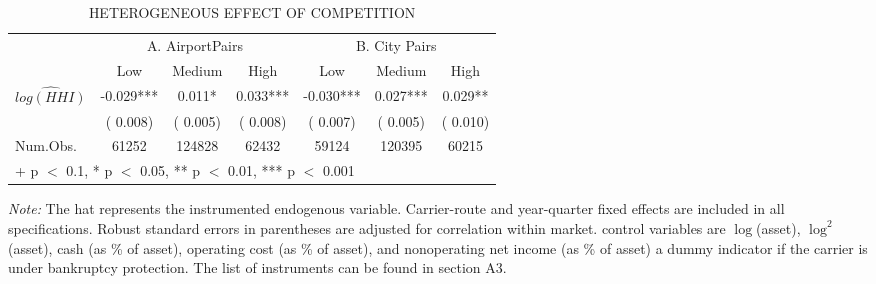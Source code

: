 \begin{table}\centering
	\caption{HETEROGENEOUS EFFECT OF COMPETITION}
	\centering
	\begin{threeparttable}
		\begin{tabular}[t]{lcccccc}\toprule\multicolumn{1}{c}{ } & \multicolumn{3}{c}{A. AirportPairs} & \multicolumn{3}{c}{B. City Pairs} \\\cmidrule(l{3pt}r{3pt}){2-4} \cmidrule(l{3pt}r{3pt}){5-7}  & Low & Medium & High & Low  & Medium  & High \\\midrule
			$\widehat{log(HHI)}$ &  {-0.029}*** &  {0.011}* &  {0.033}*** &  {-0.030}*** &  {0.027}*** &  {0.029}**\\ & ( {0.008}) & ( {0.005}) & ( {0.008}) & ( {0.007}) & ( {0.005}) & ( {0.010})\\\midrule
			Num.Obs. &  {61252} &  {124828} &  {62432} &  {59124} &  {120395} &  {60215}\\\bottomrule\multicolumn{7}{l}{\rule{0pt}{1em}+ p $<$ 0.1, * p $<$ 0.05, ** p $<$ 0.01, *** p $<$ 0.001}\\
			\end{tabular}
			\begin{tablenotes}\item \textit{Note: }The hat represents the instrumented endogenous variable. Carrier-route and year-quarter fixed effects are included in all specifications. Robust standard errors in parentheses are adjusted for correlation within market. control variables are $\log$(asset), $\log^{2}$(asset), cash (as \% of asset), operating cost (as \% of asset), and nonoperating net income (as \% of asset) a dummy indicator if the carrier is under bankruptcy protection. The list of instruments can be found in section A3.
		\end{tablenotes}
	\end{threeparttable}
\end{table}